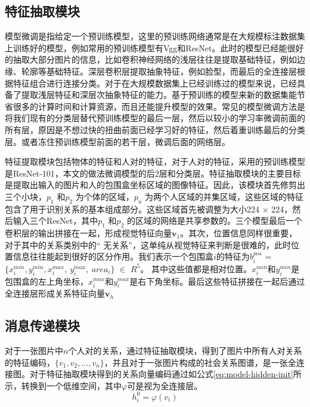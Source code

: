 \subsection{特征抽取模块}


模型微调是指给定一个预训练模型，这里的预训练网络通常是在大规模标注数据集上训练好的模型，例如常用的预训练模型有Vgg和ResNet。此时的模型已经能很好的抽取大部分图片的信息，比如卷积神经网络的浅层往往是提取基础特征，例如边缘、轮廓等基础特征。深层卷积层提取抽象特征，例如脸型，而最后的全连接层根据特征组合进行连接分类。对于在大规模数据集上已经训练过的模型来说，已经具备了提取浅层特征和深层次抽象特征的能力。基于预训练的模型来新的数据集能节省很多的计算时间和计算资源，而且还能提升模型的效果。常见的模型微调方法是将我们现有的分类层替代预训练模型的最后一层，然后以较小的学习率微调前面的所有层，原因是不想过快的扭曲前面已经学习好的特征，然后着重训练最后的分类层。或者冻住预训练模型前面的若干层，微调后面的网络层。

特征提取模块包括物体的特征和人对的特征，对于人对的特征，采用的预训练模型是ResNet-101\cite{he2016deep}，本文的做法微调模型的后2层和分类层。特征抽取模块的主要目标是提取出输入的图片和人的包围盒坐标区域的图像特征。因此，该模块首先修剪出三个小块，$p_1$ 和$p_2$ 为个体的区域，$p_{u}$ 为两个人区域的并集区域，这些区域的特征包含了用于识别关系的基本组成部分。这些区域首先被调整为大小224 $\times$ 224，然后输入三个ResNet，其中$p_1$ 和$p_2$ 的区域的网络是共享参数的。三个模型最后一个卷积层的输出拼接在一起，形成视觉特征向量$\mathbf{v}_1$。其次，位置信息同样很重要，对于其中的关系类别中的`` 无关系''，这单纯从视觉特征来判断是很难的，此时位置信息往往能起到很好的区分作用。我们表示一个包围盒$i$的特征为$b_i^{pos}$ = $\{ x_{i}^{min}, y_{i}^{min}, x_{i}^{max}, ~y_{i}^{max},~ area_{i} \}$ $\in$ $R^5$。 其中这些值都是相对位置。$x_{i}^{min}$和$y_{i}^{min}$是包围盒的左上角坐标，$x_{i}^{max}$和$y_{i}^{max}$是右下角坐标。最后这些特征拼接在一起后通过全连接层形成关系特征向量$\mathbf{v}_h$


\subsection{消息传递模块}

对于一张图片中$n$个人对的关系，通过特征抽取模块，得到了图片中所有人对关系的特征编码，$\{ v_{1},v_{2},...,v_{n} \}$，并且对于一张图片构成的社会关系图谱，是一张全连接图。对于特征抽取模块得到的关系向量编码通过如公式\ref{eq:model-hidden-init}所示，转换到一个低维空间，其中$ \varphi $可是视为全连接层。
\begin{equation} \label{eq:model-hidden-init}
    h_{i}^{0} = \varphi (v_{i})
\end{equation}


